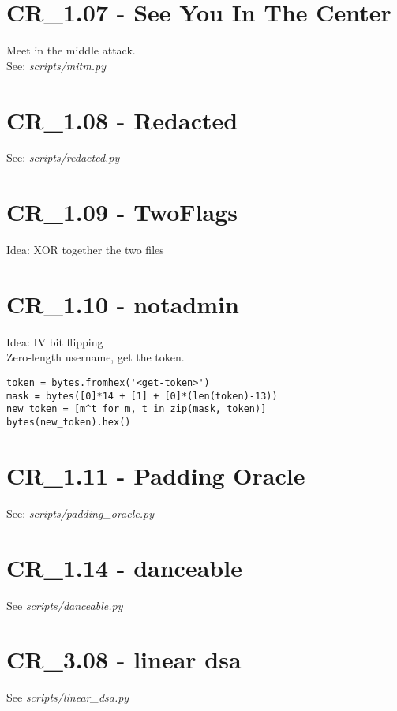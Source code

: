 \section{CR_1.07 - See You In The Center}
Meet in the middle attack. \\
See: \textit{scripts/mitm.py}

\section{CR_1.08 - Redacted}
See: \textit{scripts/redacted.py}

\section{CR_1.09 - TwoFlags}
Idea: XOR together the two files

\section{CR_1.10 - notadmin}
Idea: IV bit flipping \\

Zero-length username, get the token.
\begin{verbatim}
token = bytes.fromhex('<get-token>')
mask = bytes([0]*14 + [1] + [0]*(len(token)-13))
new_token = [m^t for m, t in zip(mask, token)]
bytes(new_token).hex()
\end{verbatim}

\section{CR_1.11 - Padding Oracle}
See: \textit{scripts/padding_oracle.py}


\section{CR_1.14 - danceable}
See \textit{scripts/danceable.py}

\section{CR_3.08 - linear dsa}
See \textit{scripts/linear_dsa.py}